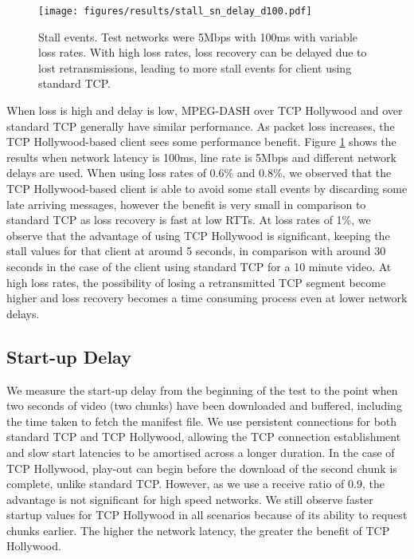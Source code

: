 \begin{figure}
  \centering
  \texttt{[image: figures/results/stall\_sn\_delay\_d100.pdf]}
  \caption{Stall events. Test networks were 5Mbps with 100ms with variable loss rates. With 
           high loss rates, loss recovery can be delayed due to lost retransmissions, leading 
           to more stall events for client using standard TCP.}
  \label{fig:stall_loss}
\end{figure}

When loss is high and delay is low, MPEG-DASH over TCP Hollywood and over standard TCP 
generally have similar performance. As packet loss increases, the TCP Hollywood-based 
client sees some performance benefit. Figure
\ref{fig:stall_loss} shows the results when network latency is 100ms, line rate is 5Mbps
and different network delays are used. When using loss rates of 0.6\% and 0.8\%, we
observed that the TCP Hollywood-based client is able to avoid some stall events by discarding 
some late arriving messages, however the benefit is very small in comparison to standard TCP 
as loss recovery is fast at low RTTs. At loss rates of 1\%, we observe that the advantage 
of using TCP Hollywood is significant, keeping the stall values for that client at around 5
seconds, in comparison with around 30 seconds in the case of the client using standard TCP 
for a 10 minute video. At high loss rates, the possibility of losing a retransmitted TCP 
segment become higher and loss recovery becomes a time consuming process even at lower 
network delays. 

\subsection{Start-up Delay}
We measure the start-up delay from the beginning of the test to the point when two seconds of
video (two chunks) have been downloaded and buffered, including the time taken to fetch the manifest
file. We use persistent connections for both standard TCP and TCP Hollywood, allowing the
TCP connection establishment and slow start latencies to be amortised across a longer
duration. In the case of TCP Hollywood, play-out can begin before the download of the
second chunk is complete, unlike standard TCP. However, as we use a receive ratio of 0.9,
the advantage is not significant for high speed networks. We still observe faster startup
values for TCP Hollywood in all scenarios because of its ability to request chunks
earlier. The higher the network latency, the greater the benefit of TCP Hollywood.


